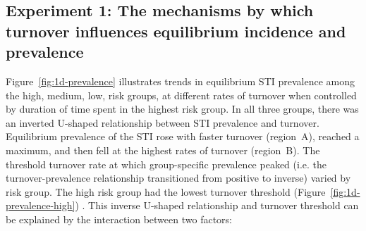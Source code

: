 \subsection{Experiment 1: The mechanisms by which turnover influences equilibrium incidence and prevalence}  %
\label{ss:res-prev-inc}
Figure~\ref{fig:1d-prevalence} illustrates trends in equilibrium STI prevalence  
among the high, medium, low, risk groups, at different rates of turnover when controlled by duration 
of time spent in the highest risk group.
In all three groups, there was an inverted U-shaped relationship between STI prevalence and turnover.
Equilibrium prevalence of the STI rose with faster turnover (region~A),
reached a maximum, and then fell at the highest rates of turnover (region~B). %
The threshold turnover rate at which group-specific prevalence peaked (i.e. the 
turnover-prevalence relationship transitioned from 
positive to inverse) varied by risk group. 
The high risk group had the lowest turnover threshold (Figure~\ref{fig:1d-prevalence-high}) .
This inverse U-shaped relationship and turnover threshold can be explained by the interaction between two factors:		%
